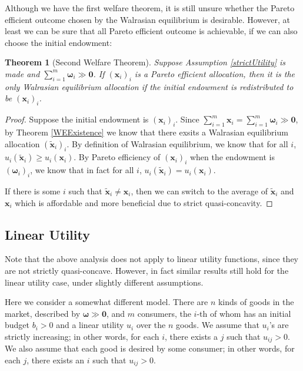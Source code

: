 \documentclass[openany]{book}
\newtheorem{theorem}{Theorem}[chapter]
\theoremstyle{remark}
\begin{document}
Although we have the first welfare theorem, it is still unsure whether the Pareto efficient outcome chosen by the Walrasian equilibrium is desirable. However, at least we can be sure that all Pareto efficient outcome is achievable, if we can also choose the initial endowment:
\begin{theorem}[Second Welfare Theorem]
    Suppose Assumption \ref{strictUtility} is made and $\sum_{i=1}^{m}\boldsymbol{\omega}_i\gg \mathbf{0}$. If $(\boldsymbol{x}_i)_{i}$ is a Pareto efficient allocation, then it is the only Walrasian equilibrium allocation if the initial endowment is redistributed to be $(\boldsymbol{x}_i)_{i}$.
\end{theorem}
\begin{proof}
    Suppose the initial endowment is $(\boldsymbol{x}_i)_{i}$. Since $\sum_{i=1}^{m}\boldsymbol{x}_i=\sum_{i=1}^{m}\boldsymbol{\omega}_i\gg \mathbf{0}$, by Theorem \ref{WEExistence} we know that there exsits a Walrasian equilibrium allocation $(\boldsymbol{\tilde{x}}_i)_{i}$. By definition of Walrasian equilibrium, we know that for all $i$, $u_i(\boldsymbol{\tilde{x}}_i)\ge u_i(\boldsymbol{x}_i)$. By Pareto efficiency of $(\boldsymbol{x}_i)_i$ when the endowment is $(\boldsymbol{\omega}_i)_i$, we know that in fact for all $i$, $u_i(\boldsymbol{\tilde{x}}_i)=u_i(\boldsymbol{x}_i)$.

    If there is some $i$ such that $\boldsymbol{\tilde{x}}_i\ne \boldsymbol{x}_i$, then we can switch to the average of $\boldsymbol{\tilde{x}}_i$ and $\boldsymbol{x}_i$ which is affordable and more beneficial due to strict quasi-concavity.
\end{proof}

\subsection{Linear Utility}
Note that the above analysis does not apply to linear utility functions, since they are not strictly quasi-concave. However, in fact similar results still hold for the linear utility case, under slightly different assumptions.

Here we consider a somewhat different model. There are $n$ kinds of goods in the market, described by $\boldsymbol{\omega}\gg \mathbf{0}$, and $m$ consumers, the $i$-th of whom has an initial budget $b_i>0$ and a linear utility $u_i$ over the $n$ goods. We assume that $u_i$'s are strictly increasing; in other words, for each $i$, there exists a $j$ such that $u_{ij}>0$. We also assume that each good is desired by some consumer; in other words, for each $j$, there exists an $i$ such that $u_{ij}>0$.
\end{document}
